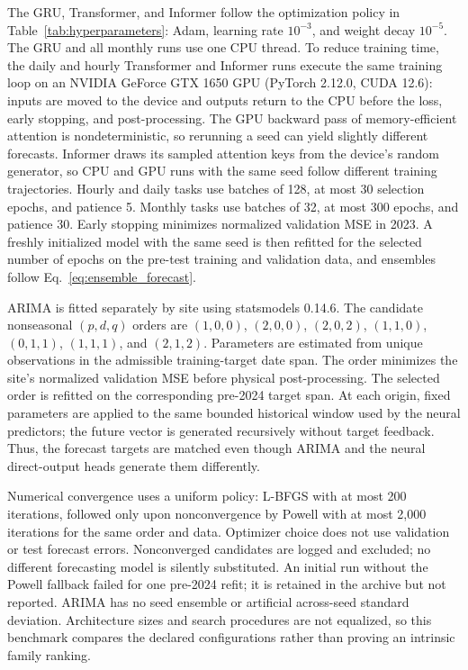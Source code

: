 The GRU, Transformer, and Informer follow the optimization policy in
Table~\ref{tab:hyperparameters}: Adam, learning rate $10^{-3}$, and weight
decay $10^{-5}$. The GRU and all monthly runs use one CPU thread. To reduce
training time, the daily and hourly Transformer and Informer runs execute
the same training loop on an NVIDIA GeForce GTX 1650 GPU (PyTorch 2.12.0,
CUDA 12.6): inputs are moved to the device and outputs return to the CPU
before the loss, early stopping, and post-processing. The GPU backward pass
of memory-efficient attention is nondeterministic, so rerunning a seed can
yield slightly different forecasts. Informer draws its sampled attention keys
from the device's random generator, so CPU and GPU runs with the same seed
follow different training trajectories. Hourly and daily tasks use batches of 128, at
most 30 selection epochs, and patience 5. Monthly tasks use batches of 32,
at most 300 epochs, and patience 30. Early stopping minimizes normalized
validation MSE in 2023. A freshly initialized model with the same seed is
then refitted for the selected number of epochs on the pre-test training
and validation data, and ensembles follow
Eq.~\eqref{eq:ensemble_forecast}.

ARIMA is fitted separately by site using statsmodels 0.14.6. The candidate
nonseasonal $(p,d,q)$ orders are $(1,0,0)$, $(2,0,0)$, $(2,0,2)$, $(1,1,0)$,
$(0,1,1)$, $(1,1,1)$, and $(2,1,2)$. Parameters are estimated from unique
observations in the admissible training-target date span. The order
minimizes the site's normalized validation MSE before physical
post-processing. The selected order is refitted on the corresponding
pre-2024 target span. At each origin, fixed parameters are applied to the
same bounded historical window used by the neural predictors; the future
vector is generated recursively without target feedback. Thus, the forecast
targets are matched even though ARIMA and the neural direct-output heads
generate them differently.

Numerical convergence uses a uniform policy: L-BFGS with at most 200
iterations, followed only upon nonconvergence by Powell with at most 2,000
iterations for the same order and data. Optimizer choice does not use
validation or test forecast errors. Nonconverged candidates are logged and
excluded; no different forecasting model is silently substituted. An
initial run without the Powell fallback failed for one pre-2024 refit; it
is retained in the archive but not reported. ARIMA has no seed ensemble or
artificial across-seed standard deviation. Architecture sizes and search
procedures are not equalized, so this benchmark compares the declared
configurations rather than proving an intrinsic family ranking.
